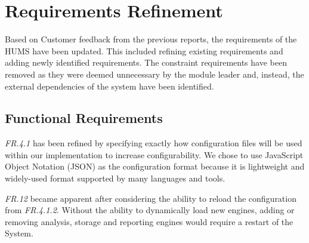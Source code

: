 \documentclass[10pt,a4paper]{article}
\begin{document}
\section{Requirements Refinement}
\label{sec:requirements}
Based on Customer feedback from the previous reports, the requirements of the HUMS have been updated. This included refining existing requirements and adding newly identified requirements. The constraint requirements have been removed as they were deemed unnecessary by the module leader and, instead, the external dependencies of the system have been identified.

\subsection{Functional Requirements}
\label{sec:functional_requirements}

\emph{FR.4.1} has been refined by specifying exactly how configuration files will be used within our implementation to increase configurability. We chose to use JavaScript Object Notation (JSON) \cite{json} as the configuration format because it is lightweight and widely-used format supported by many languages and tools.

\emph{FR.12} became apparent after considering the ability to reload the configuration from \emph{FR.4.1.2}. Without the ability to dynamically load new engines, adding or removing analysis, storage and reporting engines would require a restart of the System.
\end{document}
